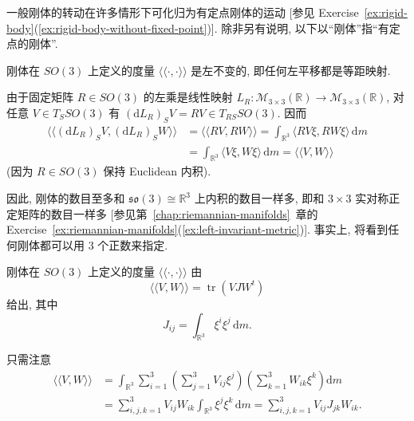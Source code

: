 \begin{RiemannRemark}\label{rem:reduction-of-rigid-body-rotation-to-fixed-point}
一般刚体的转动在许多情形下可化归为有定点刚体的运动 [参见 Exercise~\ref{ex:rigid-body}(\ref{ex:rigid-body-without-fixed-point})]. 除非另有说明, 以下以\textquotedblleft 刚体\textquotedblright 指\textquotedblleft 有定点的刚体\textquotedblright.
\end{RiemannRemark}

\begin{RiemannProposition}\label{prop:left-invariant-metric-of-rigid-body}
刚体在 $SO(3)$ 上定义的度量 $\langle\!\langle\cdot,\cdot\rangle\!\rangle$ 是左不变的, 即任何左平移都是等距映射.
\end{RiemannProposition}

\begin{RiemannProof}
由于固定矩阵 $R\in SO(3)$ 的左乘是线性映射 $L_R:\mathcal{M}_{3\times3}(\mathbb{R})\to\mathcal{M}_{3\times3}(\mathbb{R})$, 对任意 $V\in T_SSO(3)$ 有 $(\mathrm{d}L_R)_SV=RV\in T_{RS}SO(3)$. 因而
\begin{align*}
  \bigl\langle\!\bigl\langle(\mathrm{d}L_R)_SV,(\mathrm{d}L_R)_SW\bigr\rangle\!\bigr\rangle
  &=\langle\!\langle RV,RW\rangle\!\rangle
    =\int_{\mathbb{R}^3}\langle RV\xi,RW\xi\rangle\,\mathrm{d}m\\
  &=\int_{\mathbb{R}^3}\langle V\xi,W\xi\rangle\,\mathrm{d}m
    =\langle\!\langle V,W\rangle\!\rangle
\end{align*}
(因为 $R\in SO(3)$ 保持 Euclidean 内积).
\end{RiemannProof}

因此, 刚体的数目至多和 $\mathfrak{so}(3)\cong\mathbb{R}^3$ 上内积的数目一样多, 即和 $3\times3$ 实对称正定矩阵的数目一样多 [参见第~\ref{chap:riemannian-manifolds}~章的 Exercise~\ref{ex:riemannian-manifolds}(\ref{ex:left-invariant-metric})]. 事实上, 将看到任何刚体都可以用 3 个正数来指定.

\begin{RiemannProposition}\label{prop:trace-form-of-rigid-body-metric}
刚体在 $SO(3)$ 上定义的度量 $\langle\!\langle\cdot,\cdot\rangle\!\rangle$ 由
\[
  \langle\!\langle V,W\rangle\!\rangle=\operatorname{tr}(VJW^t)
\]
给出, 其中
\[
  J_{ij}=\int_{\mathbb{R}^3}\xi^i\xi^j\,\mathrm{d}m.
\]
\end{RiemannProposition}

\begin{RiemannProof}
只需注意
\begin{align*}
  \langle\!\langle V,W\rangle\!\rangle
  &=\int_{\mathbb{R}^3}\sum_{i=1}^3
    \left(\sum_{j=1}^3V_{ij}\xi^j\right)
    \left(\sum_{k=1}^3W_{ik}\xi^k\right)\mathrm{d}m\\
  &=\sum_{i,j,k=1}^3 V_{ij}W_{ik}\int_{\mathbb{R}^3}\xi^j\xi^k\,\mathrm{d}m
    =\sum_{i,j,k=1}^3 V_{ij}J_{jk}W_{ik}.
\end{align*}
\end{RiemannProof}

